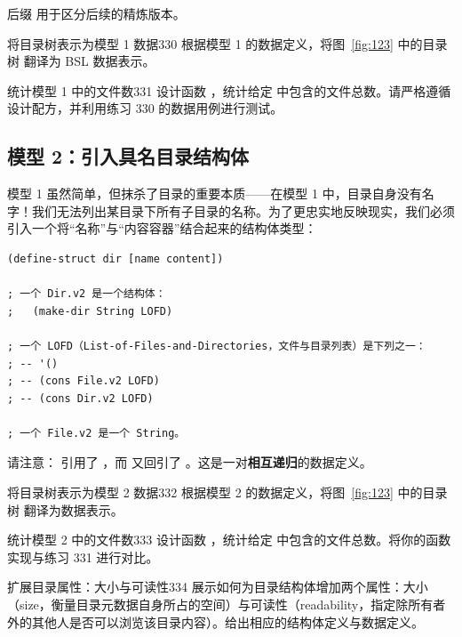 后缀  用于区分后续的精炼版本。

\begin{exercise}{将目录树表示为模型 1 数据}{330}
根据模型 1 的数据定义，将图~\ref{fig:123} 中的目录树  翻译为 BSL 数据表示。
\end{exercise}

\begin{exercise}{统计模型 1 中的文件数}{331}
设计函数 ，统计给定  中包含的文件总数。请严格遵循设计配方，并利用练习 330 的数据用例进行测试。
\end{exercise}

\subsection{模型 2：引入具名目录结构体}

模型 1 虽然简单，但抹杀了目录的重要本质——在模型 1 中，目录自身没有名字！我们无法列出某目录下所有子目录的名称。为了更忠实地反映现实，我们必须引入一个将“名称”与“内容容器”结合起来的结构体类型：

\begin{lstlisting}[language=BSL]
(define-struct dir [name content])

; 一个 Dir.v2 是一个结构体：
;   (make-dir String LOFD)

; 一个 LOFD（List-of-Files-and-Directories，文件与目录列表）是下列之一：
; -- '()
; -- (cons File.v2 LOFD)
; -- (cons Dir.v2 LOFD)

; 一个 File.v2 是一个 String。
\end{lstlisting}

请注意： 引用了 ，而  又回引了 。这是一对\textbf{相互递归}的数据定义。

\begin{exercise}{将目录树表示为模型 2 数据}{332}
根据模型 2 的数据定义，将图~\ref{fig:123} 中的目录树  翻译为数据表示。
\end{exercise}

\begin{exercise}{统计模型 2 中的文件数}{333}
设计函数 ，统计给定  中包含的文件总数。将你的函数实现与练习 331 进行对比。
\end{exercise}

\begin{exercise}{扩展目录属性：大小与可读性}{334}
展示如何为目录结构体增加两个属性：大小（size，衡量目录元数据自身所占的空间）与可读性（readability，指定除所有者外的其他人是否可以浏览该目录内容）。给出相应的结构体定义与数据定义。
\end{exercise}

